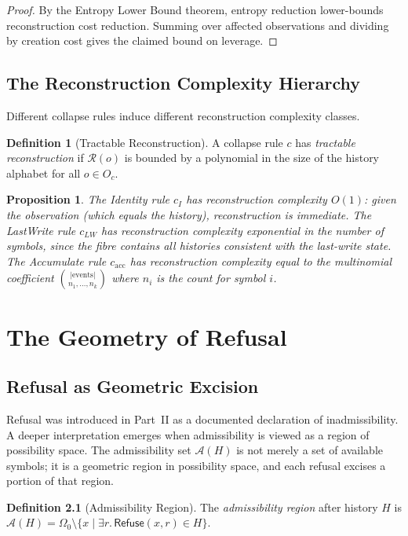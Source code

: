 \documentclass[12pt, a4paper, openany]{book}
\theoremstyle{plain}
\newtheorem{proposition}[theorem]{Proposition}
\theoremstyle{definition}
\newtheorem{definition}[theorem]{Definition}
\theoremstyle{remark}
\newcommand{\Refuse}{\mathsf{Refuse}}
\newcommand{\calA}{\mathcal{A}}
\newcommand{\calR}{\mathcal{R}}
\begin{document}
\begin{proof}
By the Entropy Lower Bound theorem, entropy reduction lower-bounds reconstruction
cost reduction. Summing over affected observations and dividing by creation cost
gives the claimed bound on leverage.
\end{proof}

\section{The Reconstruction Complexity Hierarchy}

Different collapse rules induce different reconstruction complexity classes.

\begin{definition}[Tractable Reconstruction]
A collapse rule $c$ has \emph{tractable reconstruction} if $\calR(o)$ is bounded
by a polynomial in the size of the history alphabet for all $o \in O_c$.
\end{definition}

\begin{proposition}
The Identity rule $c_I$ has reconstruction complexity $O(1)$: given the
observation (which equals the history), reconstruction is immediate. The
LastWrite rule $c_{LW}$ has reconstruction complexity exponential in the
number of symbols, since the fibre contains all histories consistent with the
last-write state. The Accumulate rule $c_{\mathrm{acc}}$ has reconstruction
complexity equal to the multinomial coefficient $\binom{|\text{events}|}{n_1, \ldots, n_k}$
where $n_i$ is the count for symbol $i$.
\end{proposition}

\chapter{The Geometry of Refusal}

\section{Refusal as Geometric Excision}

Refusal was introduced in Part~II as a documented declaration of inadmissibility.
A deeper interpretation emerges when admissibility is viewed as a region of
possibility space. The admissibility set $\calA(H)$ is not merely a set of
available symbols; it is a geometric region in possibility space, and each refusal
excises a portion of that region.

\begin{definition}[Admissibility Region]
The \emph{admissibility region} after history $H$ is
$\calA(H) = \Omega_0 \setminus \{x \mid \exists r.\, \Refuse(x,r) \in H\}$.
\end{definition}
\end{document}
